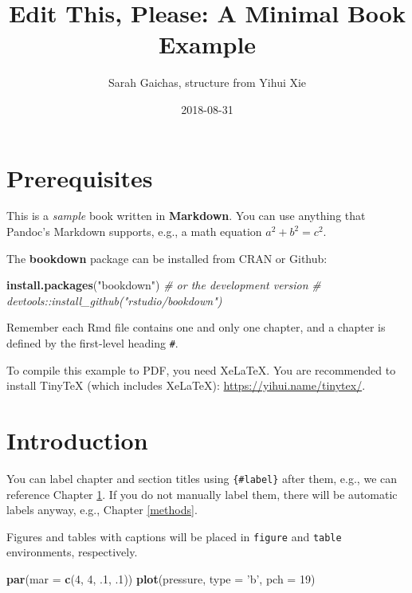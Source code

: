 \documentclass[]{book}
\title{Edit This, Please: A Minimal Book Example}
\author{Sarah Gaichas, structure from Yihui Xie}
\date{2018-08-31}
\newenvironment{Shaded}{\begin{snugshade}}{\end{snugshade}}
\newcommand{\CommentTok}[1]{\textcolor[rgb]{0.56,0.35,0.01}{\textit{#1}}}
\newcommand{\DataTypeTok}[1]{\textcolor[rgb]{0.13,0.29,0.53}{#1}}
\newcommand{\DecValTok}[1]{\textcolor[rgb]{0.00,0.00,0.81}{#1}}
\newcommand{\FloatTok}[1]{\textcolor[rgb]{0.00,0.00,0.81}{#1}}
\newcommand{\KeywordTok}[1]{\textcolor[rgb]{0.13,0.29,0.53}{\textbf{#1}}}
\newcommand{\NormalTok}[1]{#1}
\newcommand{\StringTok}[1]{\textcolor[rgb]{0.31,0.60,0.02}{#1}}
\begin{document}
\maketitle

{
\setcounter{tocdepth}{1}
\tableofcontents
}
\hypertarget{prerequisites}{%
\chapter*{Prerequisites}\label{prerequisites}}

This is a \emph{sample} book written in \textbf{Markdown}. You can use
anything that Pandoc's Markdown supports, e.g., a math equation
\(a^2 + b^2 = c^2\).

The \textbf{bookdown} package can be installed from CRAN or Github:

\begin{Shaded}
\begin{Highlighting}[]
\KeywordTok{install.packages}\NormalTok{(}\StringTok{"bookdown"}\NormalTok{)}
\CommentTok{# or the development version}
\CommentTok{# devtools::install_github("rstudio/bookdown")}
\end{Highlighting}
\end{Shaded}

Remember each Rmd file contains one and only one chapter, and a chapter
is defined by the first-level heading \texttt{\#}.

To compile this example to PDF, you need XeLaTeX. You are recommended to
install TinyTeX (which includes XeLaTeX):
\url{https://yihui.name/tinytex/}.

\hypertarget{intro}{%
\chapter{Introduction}\label{intro}}

You can label chapter and section titles using \texttt{\{\#label\}}
after them, e.g., we can reference Chapter \ref{intro}. If you do not
manually label them, there will be automatic labels anyway, e.g.,
Chapter \ref{methods}.

Figures and tables with captions will be placed in \texttt{figure} and
\texttt{table} environments, respectively.

\begin{Shaded}
\begin{Highlighting}[]
\KeywordTok{par}\NormalTok{(}\DataTypeTok{mar =} \KeywordTok{c}\NormalTok{(}\DecValTok{4}\NormalTok{, }\DecValTok{4}\NormalTok{, }\FloatTok{.1}\NormalTok{, }\FloatTok{.1}\NormalTok{))}
\KeywordTok{plot}\NormalTok{(pressure, }\DataTypeTok{type =} \StringTok{'b'}\NormalTok{, }\DataTypeTok{pch =} \DecValTok{19}\NormalTok{)}
\end{Highlighting}
\end{Shaded}
\end{document}
